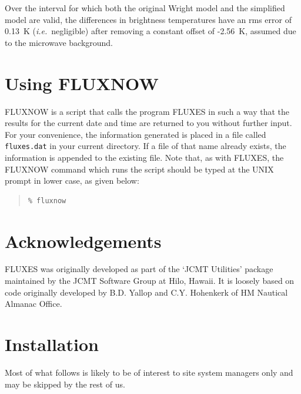 \documentclass[11pt,twoside]{article}
\newenvironment{myquote}{\begin{quote}\begin{small}}{\end{small}\end{quote}}
\newcommand{\htmladdnormallink}[2]{#1}
\newcommand{\xlabel}[1]{}
\renewcommand{\_}{\texttt{\symbol{95}}}
\begin{document}
Over the interval for which
both the original Wright model and the simplified model are valid, the
differences in brightness temperatures have an rms error of 0.13~K
({\em i.e.}\ negligible) after removing a constant offset of -2.56~K, assumed
due to the microwave background. 
 
\section{Using FLUXNOW}
\xlabel{FLUXNOW}
\label{sec:fluxnow}


FLUXNOW is a script that calls the program FLUXES in such a way that
the results for the current date and time are returned to you without
further input.  For your convenience, the information generated is
placed in a file called {\tt{fluxes.dat}} in your current directory.
If a file of that name already exists, the information is appended to
the existing file.  Note that, as with FLUXES, the FLUXNOW command
which runs the script should be typed at the UNIX prompt in lower case,
as given below:

\begin{myquote}
\begin{verbatim}
% fluxnow
\end{verbatim}
\end{myquote}

\section{Acknowledgements}
\xlabel{ACKNOWLEDGEMENTS}
\label{sec:acknowledgements}

FLUXES was originally developed as part of the
`\htmladdnormallink{JCMT}{http://www.jach.hawaii.edu/JCMT/home.html} Utilities'
package maintained by the \htmladdnormallink{JCMT Software Group}
{http://www.jach.hawaii.edu/jcmt_sw/} at Hilo, Hawaii. It is
loosely based on code originally developed by B.D. Yallop and C.Y. Hohenkerk
of \htmladdnormallink{HM Nautical Almanac Office}{http://www.ast.cam.ac.uk/}. 

\clearpage

\appendix
\section{Installation}
\xlabel{INSTALLATION}
\label{sec:installation}
 
Most of what follows is likely to be of interest to site system managers only 
and may be skipped by the rest of us.
 
\end{document}
